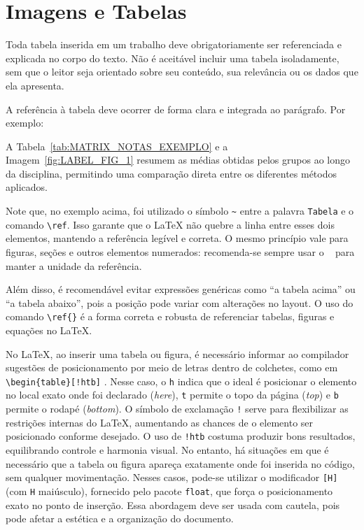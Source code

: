\section{Imagens e Tabelas}\label{sec:LABEL_CHP_2_SEC_A}

Toda tabela inserida em um trabalho deve obrigatoriamente ser referenciada e explicada no corpo do texto. Não é aceitável incluir uma tabela isoladamente, sem que o leitor seja orientado sobre seu conteúdo, sua relevância ou os dados que ela apresenta.

A referência à tabela deve ocorrer de forma clara e integrada ao parágrafo. Por exemplo:

A Tabela~\ref{tab:MATRIX_NOTAS_EXEMPLO} e a Imagem~\ref{fig:LABEL_FIG_1} resumem as médias obtidas pelos grupos ao longo da disciplina, permitindo uma comparação direta entre os diferentes métodos aplicados.

Note que, no exemplo acima, foi utilizado o símbolo \verb|~| entre a palavra \verb|Tabela| e o comando \verb|\ref|. Isso garante que o LaTeX não quebre a linha entre esses dois elementos, mantendo a referência legível e correta. O mesmo princípio vale para figuras, seções e outros elementos numerados: recomenda-se sempre usar o ~ para manter a unidade da referência.

Além disso, é recomendável evitar expressões genéricas como ``a tabela acima'' ou ``a tabela abaixo'', pois a posição pode variar com alterações no layout. O uso do comando \verb|\ref{}| é a forma correta e robusta de referenciar tabelas, figuras e equações no LaTeX.

No LaTeX, ao inserir uma tabela ou figura, é necessário informar ao compilador sugestões de posicionamento por meio de letras dentro de colchetes, como em  \verb|\begin{table}[!htb]| . Nesse caso, o  \verb|h| indica que o ideal é posicionar o elemento no local exato onde foi declarado (\textit{here}),  \verb|t| permite o topo da página (\textit{top}) e  \verb|b| permite o rodapé (\textit{bottom}). O símbolo de exclamação  \verb|!| serve para flexibilizar as restrições internas do LaTeX, aumentando as chances de o elemento ser posicionado conforme desejado. O uso de  \verb|!htb| costuma produzir bons resultados, equilibrando controle e harmonia visual. No entanto, há situações em que é necessário que a tabela ou figura apareça exatamente onde foi inserida no código, sem qualquer movimentação. Nesses casos, pode-se utilizar o modificador  \verb|[H]| (com  \verb|H| maiúsculo), fornecido pelo pacote  \verb|float|, que força o posicionamento exato no ponto de inserção. Essa abordagem deve ser usada com cautela, pois pode afetar a estética e a organização do documento.


